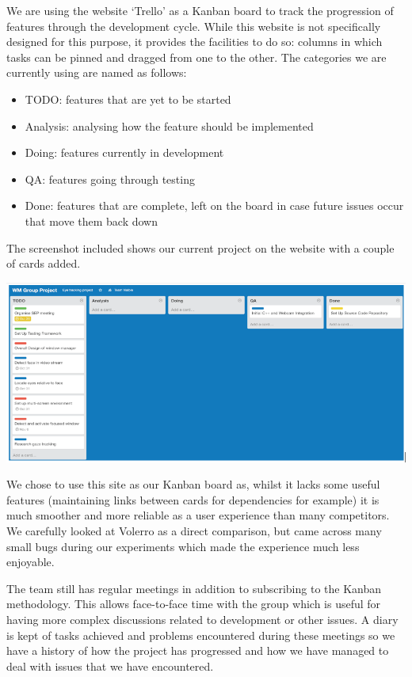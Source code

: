 \documentclass{article}
\begin{document}
\clearpage
We are using the website ‘Trello’ as a Kanban board to track the progression of features through the development cycle.  While this website is not specifically designed for this purpose, it provides the facilities to do so: columns in which tasks can be pinned and dragged from one to the other.  The categories we are currently using are named as follows:

\begin{itemize}
\item TODO: features that are yet to be started
\item Analysis: analysing how the feature should be implemented
\item Doing: features currently in development
\item QA: features going through testing
\item Done: features that are complete, left on the board in case future issues occur that move them back down
\end{itemize}

The screenshot included shows our current project on the website with a couple of cards added. \\[1mm]

{\centering
\includegraphics[scale=0.45]{trello.png}\par
}

\vspace{1mm}
We chose to use this site as our Kanban board as, whilst it lacks some useful features (maintaining links between cards for dependencies for example) it is much smoother and more reliable as a user experience than many competitors. We carefully looked at Volerro as a direct comparison, but came across many small bugs during our experiments which made the experience much less enjoyable. 

The team still has regular meetings in addition to subscribing to the Kanban methodology.  This allows face-to-face time with the group which is useful for having more complex discussions related to development or other issues.  A diary is kept of tasks achieved and problems encountered during these meetings so we have a history of how the project has progressed and how we have managed to deal with issues that we have encountered.
\end{document}
